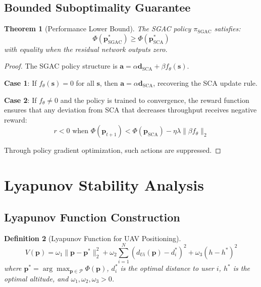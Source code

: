 \documentclass[11pt,a4paper]{article}
\newtheorem{theorem}{Theorem}[section]
\newtheorem{definition}[theorem]{Definition}
\newcommand{\calP}{\mathcal{P}}
\newcommand{\bs}{\mathbf{s}}
\newcommand{\ba}{\mathbf{a}}
\newcommand{\bp}{\mathbf{p}}
\newcommand{\dsca}{\mathbf{d}_{\text{SCA}}}
\newcommand{\psca}{\mathbf{p}_{\text{SCA}}}
\newcommand{\popt}{\mathbf{p}^*}
\begin{document}
\subsection{Bounded Suboptimality Guarantee}

\begin{theorem}[Performance Lower Bound]
\label{thm:lower_bound}
The SGAC policy $\pi_{\text{SGAC}}$ satisfies:
\begin{equation}
    \Phi(\bp^*_{\text{SGAC}}) \geq \Phi(\bp^*_{\text{SCA}})
\end{equation}
with equality when the residual network outputs zero.
\end{theorem}

\begin{proof}
The SGAC policy structure is $\ba = \alpha\dsca + \beta f_\theta(\bs)$.

\textbf{Case 1}: If $f_\theta(\bs) = 0$ for all $\bs$, then $\ba = \alpha\dsca$, recovering the SCA update rule.

\textbf{Case 2}: If $f_\theta \neq 0$ and the policy is trained to convergence, the reward function ensures that any deviation from SCA that decreases throughput receives negative reward:
\begin{equation}
    r < 0 \text{ when } \Phi(\bp_{t+1}) < \Phi(\psca) - \eta\lambda\|\beta f_\theta\|_2
\end{equation}

Through policy gradient optimization, such actions are suppressed.
\end{proof}

\section{Lyapunov Stability Analysis}

\subsection{Lyapunov Function Construction}

\begin{definition}[Lyapunov Function for UAV Positioning]
\begin{equation}
    V(\bp) = \omega_1 \|\bp - \popt\|_2^2 + \omega_2 \sum_{i=1}^N \left(d_{Ui}(\bp) - d^*_i\right)^2 + \omega_3 (h - h^*)^2
\end{equation}
where $\popt = \arg\max_{\bp \in \calP} \Phi(\bp)$, $d^*_i$ is the optimal distance to user $i$, $h^*$ is the optimal altitude, and $\omega_1, \omega_2, \omega_3 > 0$.
\end{definition}
\end{document}
